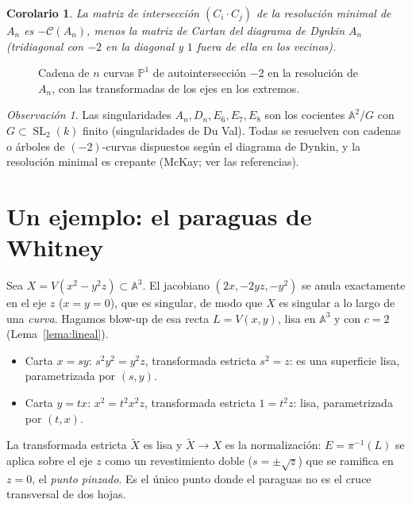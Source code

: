 \documentclass[11pt,a4paper,oneside]{book}
\newcommand{\A}{\mathbb{A}}
\newcommand{\PP}{\mathbb{P}}
\theoremstyle{plain}
\newtheorem{corolario}[teorema]{Corolario}
\theoremstyle{definition}
\theoremstyle{remark}
\newtheorem{observacion}[teorema]{Observación}
\begin{document}
\begin{corolario}
La matriz de intersección $(C_i\cdot C_j)$ de la resolución minimal de $A_n$ es $-\mathcal C(A_n)$, menos la matriz de Cartan del diagrama de Dynkin $A_n$ (tridiagonal con $-2$ en la diagonal y $1$ fuera de ella en los vecinos).
\end{corolario}

\begin{figure}[ht]
\centering
{}
\caption{Cadena de $n$ curvas $\PP^1$ de autointersección $-2$ en la resolución de $A_n$, con las transformadas de los ejes en los extremos.}
\label{fig:An}
\end{figure}

\begin{observacion}
Las singularidades $A_n,D_n,E_6,E_7,E_8$ son los cocientes $\A^2/G$ con $G\subset\operatorname{SL}_2(k)$ finito (singularidades de Du Val). Todas se resuelven con cadenas o árboles de $(-2)$-curvas dispuestos según el diagrama de Dynkin, y la resolución minimal es crepante (McKay; ver las referencias).
\end{observacion}

\section{Un ejemplo: el paraguas de Whitney}

Sea $X=V(x^2-y^2z)\subset\A^3$. El jacobiano $(2x,-2yz,-y^2)$ se anula exactamente en el eje $z$ ($x=y=0$), que es singular, de modo que $X$ es singular a lo largo de una \emph{curva}. Hagamos blow-up de esa recta $L=V(x,y)$, lisa en $\A^3$ y con $c=2$ (Lema~\ref{lema:lineal}).
\begin{itemize}
\item Carta $x=sy$: $s^2y^2=y^2z$, transformada estricta $s^2=z$: es una superficie lisa, parametrizada por $(s,y)$.
\item Carta $y=tx$: $x^2=t^2x^2z$, transformada estricta $1=t^2z$: lisa, parametrizada por $(t,x)$.
\end{itemize}
La transformada estricta $\tilde X$ es lisa y $\tilde X\to X$ es la normalización: $E=\pi^{-1}(L)$ se aplica sobre el eje $z$ como un revestimiento doble ($s=\pm\sqrt z$) que se ramifica en $z=0$, el \emph{punto pinzado}. Es el único punto donde el paraguas no es el cruce transversal de dos hojas.
\end{document}
